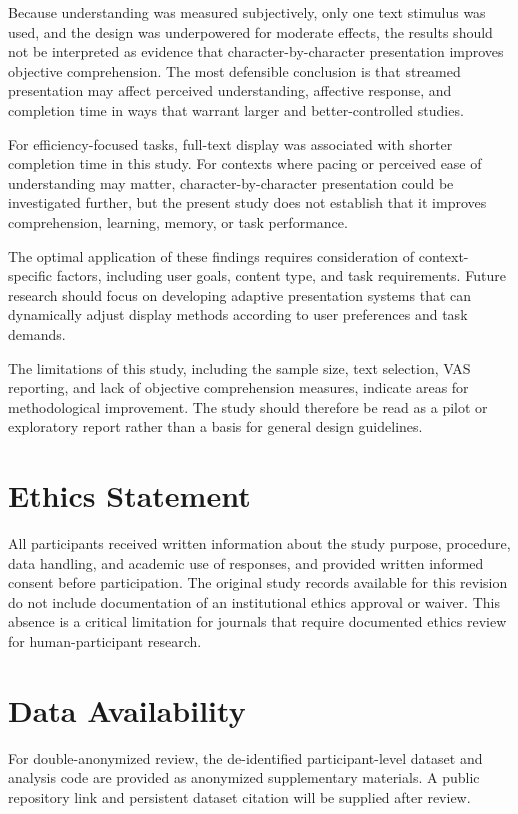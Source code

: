 \documentclass[authoryear]{elsarticle}
\begin{document}
Because understanding was measured subjectively, only one text stimulus was used, and the design was underpowered for moderate effects, the results should not be interpreted as evidence that character-by-character presentation improves objective comprehension. The most defensible conclusion is that streamed presentation may affect perceived understanding, affective response, and completion time in ways that warrant larger and better-controlled studies.

For efficiency-focused tasks, full-text display was associated with shorter completion time in this study. For contexts where pacing or perceived ease of understanding may matter, character-by-character presentation could be investigated further, but the present study does not establish that it improves comprehension, learning, memory, or task performance.

The optimal application of these findings requires consideration of context-specific factors, including user goals, content type, and task requirements. Future research should focus on developing adaptive presentation systems that can dynamically adjust display methods according to user preferences and task demands.

The limitations of this study, including the sample size, text selection, VAS reporting, and lack of objective comprehension measures, indicate areas for methodological improvement. The study should therefore be read as a pilot or exploratory report rather than a basis for general design guidelines.

\section*{Ethics Statement}
All participants received written information about the study purpose, procedure, data handling, and academic use of responses, and provided written informed consent before participation. The original study records available for this revision do not include documentation of an institutional ethics approval or waiver. This absence is a critical limitation for journals that require documented ethics review for human-participant research.

\section*{Data Availability}
For double-anonymized review, the de-identified participant-level dataset and analysis code are provided as anonymized supplementary materials. A public repository link and persistent dataset citation will be supplied after review.
\end{document}
